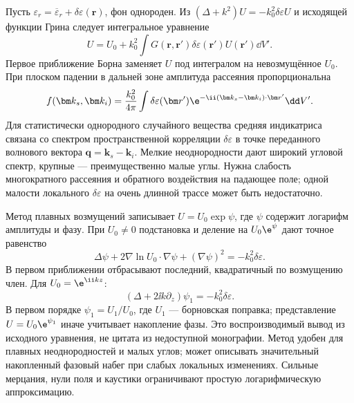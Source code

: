 
Пусть $\varepsilon_r=\overline\varepsilon_r+\delta\varepsilon(\bm r)$, фон однороден. Из $(\Delta+k^2)U=-k_0^2\delta\varepsilon U$ и исходящей функции Грина следует интегральное уравнение
\begin{equation}
 U=U_0+k_0^2\int G(\bm r,\bm r')\delta\varepsilon(\bm r')U(\bm r')\dd V'.
\end{equation}
Первое приближение Борна заменяет $U$ под интегралом на невозмущённое $U_0$. При плоском падении в дальней зоне амплитуда рассеяния пропорциональна
\begin{equation}
 f(\bm k_s,\bm k_i)=\frac{k_0^2}{4\pi}\int\delta\varepsilon(\bm r')
 \e^{-\ii(\bm k_s-\bm k_i)\cdot\bm r'}\dd V'.
\end{equation}
Для статистически однородного случайного вещества средняя индикатриса связана со спектром пространственной корреляции $\delta\varepsilon$ в точке переданного волнового вектора $\bm q=\bm k_s-\bm k_i$. Мелкие неоднородности дают широкий угловой спектр, крупные — преимущественно малые углы. Нужна слабость многократного рассеяния и обратного воздействия на падающее поле; одной малости локального $\delta\varepsilon$ на очень длинной трассе может быть недостаточно.

Метод плавных возмущений записывает $U=U_0\exp\psi$, где $\psi$ содержит логарифм амплитуды и фазу. При $U_0\ne0$ подстановка и деление на $U_0\e^\psi$ дают точное равенство
\begin{equation}\label{eq:rytovexact}
 \Delta\psi+2\nabla\ln U_0\cdot\nabla\psi+(\nabla\psi)^2
 =-k_0^2\delta\varepsilon.
\end{equation}
В первом приближении отбрасывают последний, квадратичный по возмущению член. Для $U_0=\e^{\ii kz}$:
\begin{equation}\label{eq:rytovfirst}
 (\Delta+2\ii k\partial_z)\psi_1=-k_0^2\delta\varepsilon.
\end{equation}
В первом порядке $\psi_1=U_1/U_0$, где $U_1$ --- борновская поправка; представление $U=U_0\e^{\psi_1}$ иначе учитывает накопление фазы. Это воспроизводимый вывод из исходного уравнения, не цитата из недоступной монографии. Метод удобен для плавных неоднородностей и малых углов; может описывать значительный накопленный фазовый набег при слабых локальных изменениях. Сильные мерцания, нули поля и каустики ограничивают простую логарифмическую аппроксимацию.
